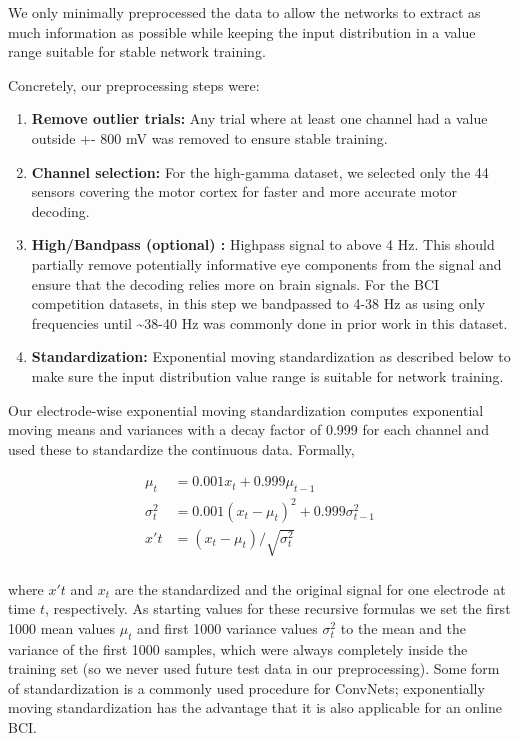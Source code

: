     We only minimally preprocessed the data to allow the networks to extract
as much information as possible while keeping the input distribution in
a value range suitable for stable network training.

Concretely, our preprocessing steps were:

\begin{enumerate}
\item
  \textbf{Remove outlier trials:} Any trial where at least one channel
  had a value outside +- 800 mV was removed to ensure stable training.
\item
  \textbf{Channel selection:} For the high-gamma dataset, we selected
  only the 44 sensors covering the motor cortex for faster and more
  accurate motor decoding.
\item
  \textbf{High/Bandpass (optional) :} Highpass signal to above 4 Hz.
  This should partially remove potentially informative eye components
  from the signal and ensure that the decoding relies more on brain
  signals. For the BCI competition datasets, in this step we bandpassed
  to 4-38 Hz as using only frequencies until \textasciitilde38-40 Hz was
  commonly done in prior work in this dataset.
\item
  \textbf{Standardization:} Exponential moving standardization as
  described below to make sure the input distribution value range is
  suitable for network training.
\end{enumerate}

Our electrode-wise exponential moving standardization computes
exponential moving means and variances with a decay factor of 0.999 for
each channel and used these to standardize the continuous data.
Formally,

\begin{align}
\mu_t &= 0.001 x_t + 0.999\mu_{t-1}\\
\sigma_t^2 &= 0.001(x_t - \mu_t)^2 + 0.999 \sigma_{t-1}^2\\
x't &= (x_t - \mu_t) / \sqrt{\sigma_t^2}\\
\end{align}

where $x't$ and $x_t$ are the standardized and the original signal
for one electrode at time $t$, respectively. As starting values for
these recursive formulas we set the first 1000 mean values $\mu_t$ and
first 1000 variance values $\sigma_t^2$ to the mean and the variance
of the first 1000 samples, which were always completely inside the
training set (so we never used future test data in our preprocessing).
Some form of standardization is a commonly used procedure for ConvNets;
exponentially moving standardization has the advantage that it is also
applicable for an online BCI.

